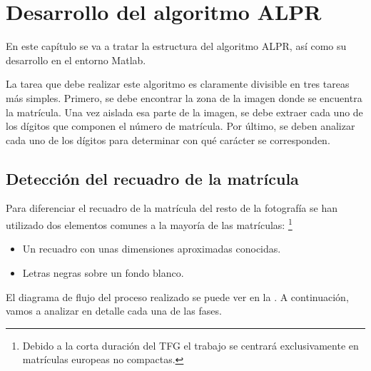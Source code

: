 \chapter{Desarrollo del algoritmo \acs{ALPR}}
En este capítulo se va a tratar la estructura del algoritmo \ac{ALPR}, así como su desarrollo en el entorno Matlab. 

La tarea que debe realizar este algoritmo es claramente divisible en tres tareas más simples. Primero, se debe encontrar la zona de la imagen donde se encuentra la matrícula. Una vez aislada esa parte de la imagen, se debe extraer cada uno de los dígitos que componen el número de matrícula. Por último, se deben analizar cada uno de los dígitos para determinar con qué carácter se corresponden.

\section{Detección del recuadro de la matrícula}
Para diferenciar el recuadro de la matrícula del resto de la fotografía se han utilizado dos elementos comunes a la mayoría de las matrículas: 
\footnote{Debido a la corta duración del \ac{TFG} el trabajo se centrará exclusivamente en matrículas europeas no compactas.}

\begin{itemize}
\item Un recuadro con unas dimensiones aproximadas conocidas.
\item Letras negras sobre un fondo blanco.
\end{itemize}

El diagrama de flujo del proceso realizado se puede ver en la . A continuación, vamos a analizar en detalle cada una de las fases.

